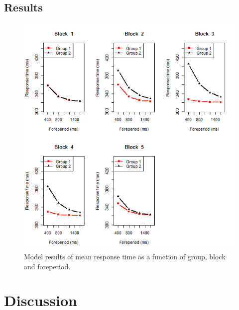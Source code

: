 \documentclass[10pt,letterpaper]{article}
\begin{document}
\subsection{Results}



\begin{figure}
	\centering
	\includegraphics[width=\columnwidth]{5blocks2.png}
	\caption{Model results of mean response time as a function of group, block and foreperiod.}
	\label{5blocks}
\end{figure}

\section{Discussion}




\setlength{\bibleftmargin}{.125in}
\setlength{\bibindent}{-\bibleftmargin}

\end{document}

